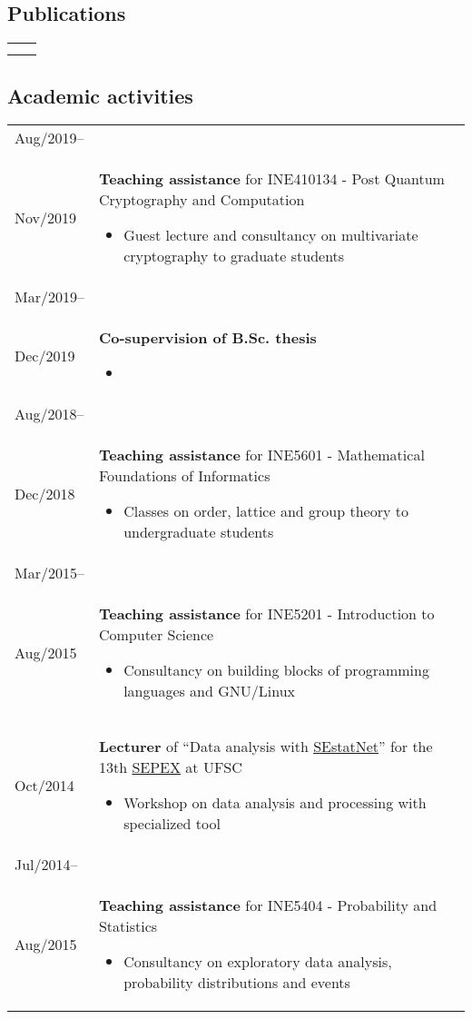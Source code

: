 \documentclass[12pt]{article}
\makeatletter
\newenvironment{sidetable}
  {\newcolumntype{L}{>{\bf \raggedright}p{0.14\textwidth}}
   \newcolumntype{R}{p{0.80\textwidth}}
   \begin{tabular}{@{\hspace{0mm}}LR}}
  {\end{tabular}}
\newenvironment{contenttable}[1]
  {\subsection*{#1}
   \begin{sidetable}}
  {\end{sidetable}}
\makeatother
\begin{document}
\begin{contenttable}{Publications}
  \cite{Zambonin:inproc:2019:jul}
    & \hspace{0mm} \\
  \cite{Perin:inproc:2018:jun}
    & \hspace{0mm} \\
\end{contenttable}

\begin{contenttable}{Academic activities}
  Aug/2019-- \\ Nov/2019 & \textbf{Teaching assistance} for INE410134 - Post
    Quantum Cryptography and Computation
    \begin{itemize}
      \item Guest lecture and consultancy on multivariate cryptography to
          graduate students
    \end{itemize} \\
  Mar/2019-- \\ Dec/2019 & \textbf{Co-supervision of B.Sc. thesis}
    \begin{itemize}
      \item {}
    \end{itemize} \\
  Aug/2018-- \\ Dec/2018 & \textbf{Teaching assistance} for INE5601 -
    Mathematical Foundations of Informatics
    \begin{itemize}
      \item Classes on order, lattice and group theory to undergraduate
          students
    \end{itemize} \\
  Mar/2015-- \\ Aug/2015 & \textbf{Teaching assistance} for INE5201 -
    Introduction to Computer Science
    \begin{itemize}
      \item Consultancy on building blocks of programming languages and
          GNU/Linux
    \end{itemize} \\
    Oct/2014 & \textbf{Lecturer} of ``Data analysis with
      \href{http://sestatnet.ufsc.br}{SEstatNet}'' for the 13th
      \href{https://sepex.ufsc.br/}{SEPEX} at UFSC
    \begin{itemize}
      \item Workshop on data analysis and processing with specialized tool
    \end{itemize} \\
  Jul/2014-- \\ Aug/2015 & \textbf{Teaching assistance} for INE5404 -
    Probability and Statistics
    \begin{itemize}
      \item Consultancy on exploratory data analysis, probability
          distributions and events
    \end{itemize}
\end{contenttable}
\end{document}
